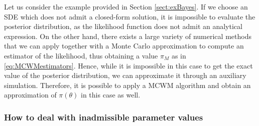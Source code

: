 Let us consider the example provided in Section \ref{sect:exBayes}. If we choose an SDE which does not admit a closed-form solution, it is impossible to evaluate the posterior distribution, as the likelihood function does not admit an analytical expression. On the other hand, there exists a large variety of numerical methods \cite{KPS94} that we can apply together with a Monte Carlo approximation to compute an estimator of the likelihood, thus obtaining a value $\pi_M$ as in \eqref{eq:MCWMestimators}. Hence, while it is impossible in this case to get the exact value of the posterior distribution, we can approximate it through an auxiliary simulation. Therefore, it is possible to apply a MCWM algorithm and obtain an approximation of $\pi(\theta)$ in this case as well.

\subsubsection{How to deal with inadmissible parameter values}\label{sec:MCMCbounded}

